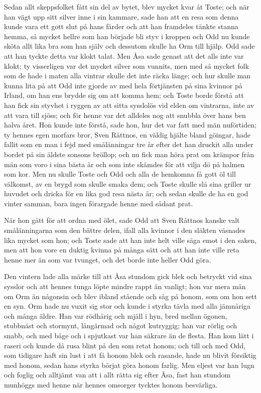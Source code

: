 \initial Sedan allt skeppsfolket fått sin del av bytet, blev mycket kvar åt Toste; och när han vägt upp sitt silver inne i sin kammare, sade han att en resa som denna kunde vara ett gott slut på hans färder och att han framdeles tänkte stanna hemma, så mycket hellre som han började bli styv i kroppen och Odd nu kunde sköta allt lika bra som han själv och dessutom skulle ha Orm till hjälp. Odd sade att han tyckte detta var klokt talat. Men Åsa sade genast att det alls inte var klokt; ty visserligen var det mycket silver som vunnits, men med så mycket folk som de hade i maten alla vintrar skulle det inte räcka länge; och hur skulle man kunna lita på att Odd inte gjorde av med hela förtjänsten på sina kvinnor på Irland, om han ens brydde sig om att komma hem; och Toste borde förstå att han fick sin styvhet i ryggen av att sitta sysslolös vid elden om vintrarna, inte av att vara till sjöss; och för henne var det alldeles nog att snubbla över hans ben halva året. Hon kunde inte förstå, sade hon, hur det var fatt med män nuförtiden; ty hennes egen morfars bror, Sven Råttnos, en väldig hjälte bland göingar, hade fallit som en man i fejd med smålänningar tre år efter det han druckit alla under bordet på sin äldste sonsons bröllop; och nu fick man höra prat om krämpor från män som voro i sina bästa år och som inte skämdes för att vilja dö på halmen som kor. Men nu skulle Toste och Odd och alla de hemkomna få gott öl till välkomst, av en brygd som skulle smaka dem; och Toste skulle slå sina griller ur huvudet och dricka för en lika god resa nästa år; och sedan skulle de ha en god vinter samman, bara ingen förargade henne med sådant prat.

\initial När hon gått för att ordna med ölet, sade Odd att Sven Råttnos kanske valt smålänningarna som den bättre delen, ifall alla kvinnor i den släkten väsnades lika mycket som hon; och Toste sade att han inte helt ville säga emot i den saken, men att hon vore en duktig kvinna på många sätt och att han inte ville reta henne mer än som var tvunget, och det borde inte heller Odd göra.

\initial Den vintern lade alla märke till att Åsa stundom gick blek och betryckt vid sina sysslor och att hennes tunga löpte mindre rappt än vanligt; hon var mera mån om Orm än någonsin och blev ibland stående och såg på honom, som om hon sett en syn. Orm hade nu vuxit sig stor och kunde i styrka tävla med alla jämnåriga och många äldre. Han var rödhårig och mjäll i hyn, bred mellan ögonen, stubbnäst och stormynt, långärmad och något kutryggig; han var rörlig och snabb, och med båge och i spjutkast var han säkrare än de flesta. Han kom lätt i raseri och kunde då rusa blint på den som retat honom; och till och med Odd, som tidigare haft sin lust i att få honom blek och rasande, hade nu blivit försiktig med honom, sedan hans styrka börjat göra honom farlig. Men eljest var han lugn och foglig och alltjämt van att i allt rätta sig efter Åsa, fast han stundom munhöggs med henne när hennes omsorger tycktes honom besvärliga.

